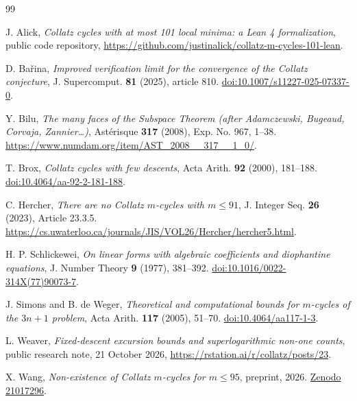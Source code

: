 \documentclass[11pt]{article}
\theoremstyle{definition}
\begin{document}
\begin{thebibliography}{99}

J. Alick, \emph{Collatz cycles with at most 101 local minima:
a Lean 4 formalization}, public code repository,
\url{https://github.com/justinalick/collatz-m-cycles-101-lean}.

D. Ba\v{r}ina, \emph{Improved verification limit for the
convergence of the Collatz conjecture},
J. Supercomput. \textbf{81} (2025), article 810.
\href{https://doi.org/10.1007/s11227-025-07337-0}{doi:10.1007/s11227-025-07337-0}.

Y. Bilu, \emph{The many faces of the Subspace Theorem
(after Adamczewski, Bugeaud, Corvaja, Zannier\ldots)},
Ast\'erisque \textbf{317} (2008), Exp. No. 967, 1--38.
\url{https://www.numdam.org/item/AST_2008__317__1_0/}.

T. Brox, \emph{Collatz cycles with few descents},
Acta Arith. \textbf{92} (2000), 181--188.
\href{https://doi.org/10.4064/aa-92-2-181-188}{doi:10.4064/aa-92-2-181-188}.

C. Hercher, \emph{There are no Collatz \(m\)-cycles with \(m\le91\)},
J. Integer Seq. \textbf{26} (2023), Article 23.3.5.
\url{https://cs.uwaterloo.ca/journals/JIS/VOL26/Hercher/hercher5.html}.

H. P. Schlickewei, \emph{On linear forms with algebraic coefficients
and diophantine equations}, J. Number Theory \textbf{9} (1977),
381--392.
\href{https://doi.org/10.1016/0022-314X(77)90073-7}{doi:10.1016/0022-314X(77)90073-7}.

J. Simons and B. de Weger, \emph{Theoretical and computational bounds
for \(m\)-cycles of the \(3n+1\) problem}, Acta Arith. \textbf{117}
(2005), 51--70.
\href{https://doi.org/10.4064/aa117-1-3}{doi:10.4064/aa117-1-3}.

L. Weaver, \emph{Fixed-descent excursion bounds and
superlogarithmic non-one counts}, public research note, 21 October
2026, \url{https://rstation.ai/r/collatz/posts/23}.

X. Wang, \emph{Non-existence of Collatz \(m\)-cycles for \(m\le95\)},
preprint, 2026. \href{https://doi.org/10.5281/zenodo.21017296}{Zenodo 21017296}.

\end{thebibliography}
\end{document}
